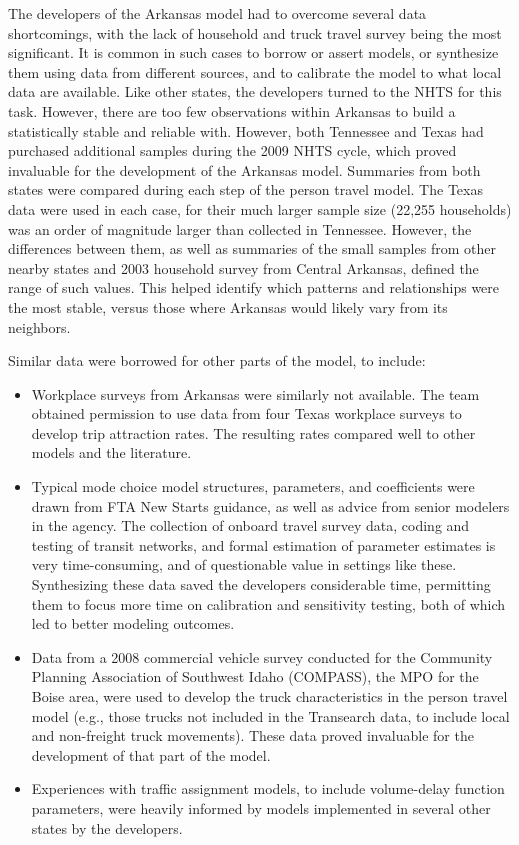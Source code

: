 The developers of the Arkansas model had to overcome several data shortcomings, with the lack of household and truck travel survey being the most significant. It is common in such cases to borrow or assert models, or synthesize them using data from different sources, and to calibrate the model to what local data are available. Like other states, the developers turned to the NHTS for this task. However, there are too few observations within Arkansas to build a statistically stable and reliable with. However, both Tennessee and Texas had purchased additional samples during the 2009 NHTS cycle, which proved invaluable for the development of the Arkansas model. Summaries from both states were compared during each step of the person travel model. The Texas data were used in each case, for their much larger sample size (22,255 households) was an order of magnitude larger than collected in Tennessee. However, the differences between them, as well as summaries of the small samples from other nearby states and 2003 household survey from Central Arkansas, defined the range of such values. This helped identify which patterns and relationships were the most stable, versus those where Arkansas would likely vary from its neighbors.

Similar data were borrowed for other parts of the model, to include:
\begin{itemize}
\item
Workplace surveys from Arkansas were similarly not available. The team obtained permission to use data from four Texas workplace surveys to develop trip attraction rates. The resulting rates compared well to other models and the literature.
\item
Typical mode choice model structures, parameters, and coefficients were drawn from FTA New Starts guidance, as well as advice from senior modelers in the agency. The collection of onboard travel survey data, coding and testing of transit networks, and formal estimation of parameter estimates is very time-consuming, and of questionable value in settings like these. Synthesizing these data saved the developers considerable time, permitting them to focus more time on calibration and sensitivity testing, both of which led to better modeling outcomes.
\item
Data from a 2008 commercial vehicle survey conducted for the Community Planning Association of Southwest Idaho (COMPASS), the MPO for the Boise area, were used to develop the truck characteristics in the person travel model (e.g., those trucks not included in the Transearch data, to include local and non-freight truck movements). These data proved invaluable for the development of that part of the model.
\item
Experiences with traffic assignment models, to include volume-delay function parameters, were heavily informed by models implemented in several other states by the developers.
\end{itemize}

